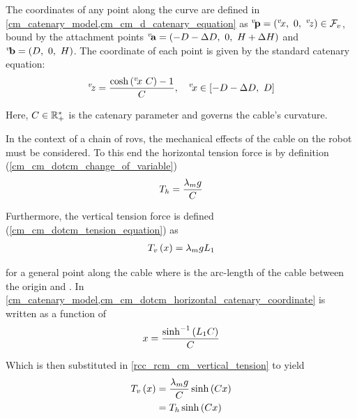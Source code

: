 The coordinates of any point along the curve are defined in
\cref{cm_catenary_model,cm_cm_d_catenary_equation} as $\fpoint{P}{v} =
	\left(\coord{x}{v},~0,~\coord{z}{v}\right) \in \lframe{v}$, bound by the attachment points
$\fpoint{A}{v}=\left(-\catD-\catdD,~0,~\catH+\catdH\right)$ and
$\fpoint{B}{v}=\left(\catD,~0,~\catH\right)$. The  coordinate of each point is given by
the standard catenary equation:
\begin{align}
	\coord{z}{v} = \frac{\cosh{(\coord{x}{v}~\catC)} - 1}{\catC}, \quad \coord{x}{v} \in \left[-\catD-\catdD,~\catD\right]
\end{align}

Here, $C \in \mathbb{R}^*_+$ is the catenary parameter and governs the cable's curvature.

In the context of a chain of \acp{rov}, the mechanical effects of the cable on the robot must be
considered. To this end the horizontal tension force is by definition
(\cref{cm_cm_dotcm_change_of_variable})
\begin{align}
	{T}_{h} = \frac{{\lambda}_{m}g}{C{}}
\end{align}

Furthermore, the vertical tension force is defined (\cref{cm_cm_dotcm_tension_equation}) as
\begin{align}
	{T}_{v}\left(x\right) = {\lambda}_{m}g{L}_{1}
	\label{rcc_rcm_cm_vertical_tension}
\end{align}

for a general point  along the cable where  is the arc-length of the
cable between the origin  and . In
\cref{cm_catenary_model,cm_cm_dotcm_horizontal_catenary_coordinate}  is written as a
function of 
\begin{align}
	x = \frac{\sinh^{-1}\left(L_1 C\right)}{C}
\end{align}

Which is then substituted in \cref{rcc_rcm_cm_vertical_tension} to yield
\begin{align}
	{T}_{v}\left(x\right) & = \frac{{\lambda}_{m}g}{C{}}\sinh{\left(\ensuremath{C}x\right)} \\
	                            & = {T}_{h}\sinh{\left(\ensuremath{C}x\right)}
\end{align}

